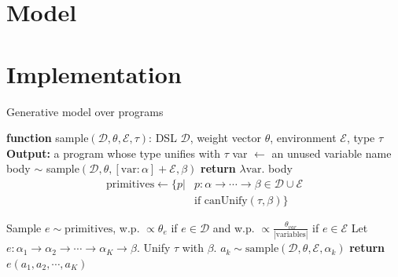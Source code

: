 \documentclass{article}
\begin{document}
\section{Model}



\section{Implementation}

\begin{algorithm}[tb]
   \caption{Generative model over programs}
   \label{programGenerativeModel}
   \begin{algorithmic}
     \STATE \textbf{function} sample$(\mathcal{D}, \theta, \mathcal{E}, \tau)$:
   DSL $\mathcal{D}$, weight vector $\theta$, environment $\mathcal{E}$, type $\tau$
  \STATE \textbf{Output:} a program whose type unifies with $\tau$
  \IF{$\tau = \alpha\to\beta$}
  \STATE var $\gets$ an unused variable name
  \STATE body $\sim$ sample$(\mathcal{D},\theta,[\text{var}:\alpha]+\mathcal{E},\beta)$
   \STATE \textbf{return} $\lambda \text{var}.$ body
   \ENDIF
   \STATE\begin{align*}     \text{primitives} \gets\{p | &p:\alpha\to\cdots\to\beta \in \mathcal{D}\cup\mathcal{E}\\     &\text{if canUnify}(\tau,\beta) \}     \end{align*}
   
   \STATE Sample $e\sim \text{primitives}$, w.p. $\propto\theta_e$ if $e\in \mathcal{D}$ and w.p. $\propto\frac{\theta_{var}}{|\text{variables}|}$ if $e\in \mathcal{E}$
   \STATE Let $e:\alpha_1\to\alpha_2\to\cdots\to \alpha_K\to\beta$. Unify $\tau$ with $\beta$.
 \STATE $a_k\sim\text{sample}(\mathcal{D},\theta,\mathcal{E},\alpha_k)$
 \ENDFOR
 \STATE \textbf{return} $e(a_1, a_2, \cdots, a_K)$
\end{algorithmic}
\end{algorithm}
\end{document}
